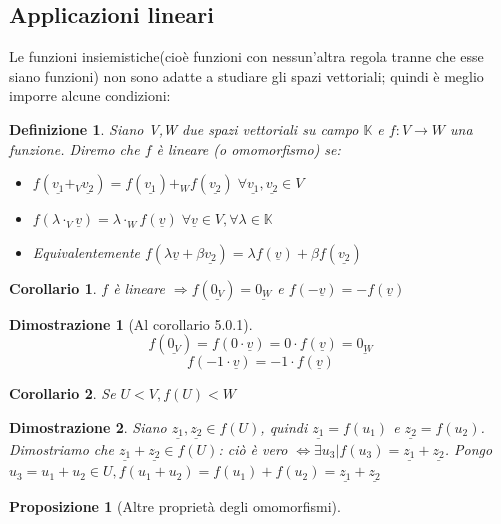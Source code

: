 \documentclass[12pt]{article}
\newenvironment{para}{\begin{adjustwidth}{13mm}{}}{\end{adjustwidth}}
\newtheorem{Definizione}{Definizione}[subsection]
\newtheorem{Corollario}{Corollario}[subsection]
\newtheorem{Proposizione}{Proposizione}[subsection]
\newtheorem{Dimostrazione}{Dimostrazione}[subsection]
\begin{document}
\begin{para}
\section{Applicazioni lineari}
Le funzioni insiemistiche(cioè funzioni con nessun'altra regola tranne che esse siano funzioni) non sono adatte a studiare gli spazi vettoriali; quindi è meglio imporre alcune condizioni:
\begin{Definizione}
    Siano V,W due spazi vettoriali su campo $\mathbb{K}$ e $f:V\rightarrow W$ una funzione. Diremo che $f$ è lineare (o omomorfismo) se:
    \begin{itemize}
        \item $f(\underline{v_1}+_{V}\underline{v_2}) = f(\underline{v_1}) +_{W}f(\underline{v_2}) \; \forall \underline{v_1},\underline{v_2} \in V$
        \item $f(\lambda \cdot_{V} \underline{v}) = \lambda \cdot_{W} f(\underline{v}) \; \forall \underline{v} \in V, \forall \lambda \in \mathbb{K}$
        \item Equivalentemente $f(\lambda \underline{v} + \beta \underline{v_2}) = \lambda f( \underline{v}) + \beta f( \underline{v_2})$
    \end{itemize}
\end{Definizione}
\begin{Corollario}
    $f$ è lineare $\Rightarrow f(\underline{0_V}) = \underline{0_W}$ e $f(-\underline{v}) = -f(\underline{v})$
\end{Corollario}
\begin{Dimostrazione}[Al corollario 5.0.1]
   $$ f(\underline{0_V}) = f(0 \cdot \underline{v}) = 0 \cdot f(\underline{v}) = \underline{0_W}$$
   $$ f(-1 \cdot \underline{v}) = -1 \cdot f(\underline{v})$$
\end{Dimostrazione}
\begin{Corollario}
    Se $U < V, f(U) < W$
\end{Corollario}
\begin{Dimostrazione}
    Siano $\underline{z_1}, \underline{z_2} \in f(U)$, quindi $\underline{z_1} = f(u_1)$ e $\underline{z_2} = f(u_2)$. Dimostriamo che $\underline{z_1} + \underline{z_2} \in f(U)$: ciò è vero $\Leftrightarrow \exists u_3|f(u_3)=\underline{z_1}+\underline{z_2}$. \newline
    Pongo $u_3 = u_1 + u_2 \in U, f(u_1+u_2) = f(u_1)+f(u_2)=\underline{z_1}+\underline{z_2}$
\end{Dimostrazione}
\begin{Proposizione}[Altre proprietà degli omomorfismi]

\end{Proposizione}
\end{para}
\end{document}
